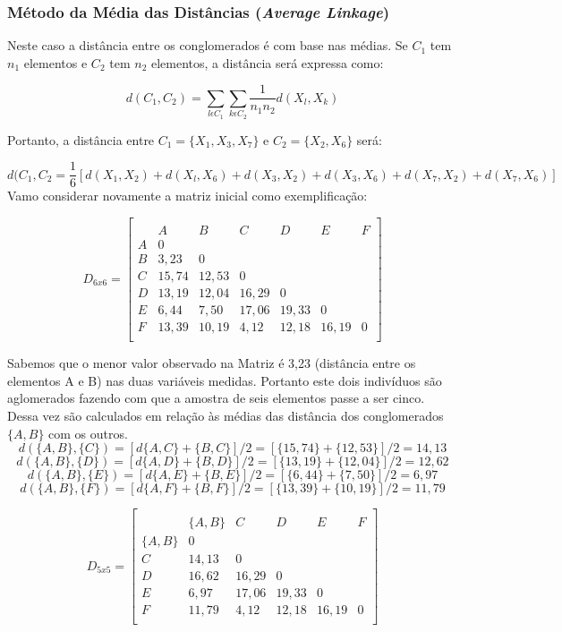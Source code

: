 \documentclass[
  openany]{book}
\begin{document}
\hypertarget{muxe9todo-da-muxe9dia-das-distuxe2ncias-average-linkage}{%
\subsubsection{\texorpdfstring{Método da Média das Distâncias (\emph{Average Linkage})}{Método da Média das Distâncias (Average Linkage)}}\label{muxe9todo-da-muxe9dia-das-distuxe2ncias-average-linkage}}

Neste caso a distância entre os conglomerados é com base nas médias. Se \(C_1\) tem \(n_1\) elementos e \(C_2\) tem \(n_2\) elementos, a distância será expressa como:

\begin{equation}
d(C_1,C_2)=\displaystyle \sum_{l\epsilon C_1} \sum_{k\epsilon C_2} \frac{1}{n_1 n_2} d(X_l,X_k)
 \label{eq:ligmedia}
\end{equation}

Portanto, a distância entre \(C_1=\{X_1,X_3,X_7\}\) e \(C_2=\{X_2,X_6\}\) será:

\[d(C_1,C_2=\frac{1}{6}[d(X_1,X_2)+d(X_l,X_6)+d(X_3,X_2)+d(X_3,X_6)+d(X_7,X_2)+d(X_7,X_6)]\]
Vamo considerar novamente a matriz inicial como exemplificação:

\[D_{6x6}=\begin{bmatrix}\\
 &A&B&C&D&E&F \\
 A&0&&&&&\\
 B&3,23&0&&&&\\
 C & 15,74& 12,53&0&&&\\
 D& 13,19& 12,04& 16,29&0&&\\
 E& 6,44& 7,50& 17,06& 19,33&0&\\
 F& 13,39& 10,19& 4,12& 12,18& 16,19&0 \\
\end{bmatrix}\]

Sabemos que o menor valor observado na Matriz é 3,23 (distância entre os elementos A e B) nas duas variáveis medidas. Portanto este dois indivíduos são aglomerados fazendo com que a amostra de seis elementos passe a ser cinco. Dessa vez são calculados em relação às médias das distância dos conglomerados \(\{A,B\}\) com os outros.
\[d(\{A,B\},\{C\})=[d\{A,C\}+\{B,C\}]/2=[\{15,74\}+\{12,53\}]/2=14,13\]
\[d(\{A,B\},\{D\})=[d\{A,D\}+\{B,D\}]/2=[\{13,19\}+\{12,04\}]/2=12,62\]
\[d(\{A,B\},\{E\})=[d\{A,E\}+\{B,E\}]/2=[\{6,44\}+\{7,50\}]/2=6,97\]
\[d(\{A,B\},\{F\})=[d\{A,F\}+\{B,F\}]/2=[\{13,39\}+\{10,19\}]/2=11,79\]

\[D_{5x5}=\begin{bmatrix}\\
 &\{A,B\}&C&D&E&F \\
 \{A,B\}&0&&&&\\
 C & 14,13&0&&&\\
 D& 16,62& 16,29&0&&\\
 E& 6,97& 17,06& 19,33&0&\\
 F& 11,79& 4,12& 12,18& 16,19&0 \\
\end{bmatrix}\]
\end{document}
